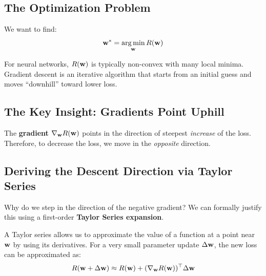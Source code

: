 \subsection{The Optimization Problem}

We want to find:
\[
\mathbf{w}^* = \mathop{\mathrm{arg\,min}}_{\mathbf{w}} R(\mathbf{w})
\]

For neural networks, $R(\mathbf{w})$ is typically non-convex with many local minima. Gradient descent is an iterative algorithm that starts from an initial guess and moves ``downhill'' toward lower loss.

\subsection{The Key Insight: Gradients Point Uphill}

The \textbf{gradient} $\nabla_{\mathbf{w}} R(\mathbf{w})$ points in the direction of steepest \textit{increase} of the loss. Therefore, to decrease the loss, we move in the \textit{opposite} direction.

\begin{center}
\end{center}

\subsection{Deriving the Descent Direction via Taylor Series}

Why do we step in the direction of the negative gradient? We can formally justify this using a first-order \textbf{Taylor Series expansion}. 

A Taylor series allows us to approximate the value of a function at a point near $\mathbf{w}$ by using its derivatives. For a very small parameter update $\Delta \mathbf{w}$, the new loss can be approximated as:
\[
R(\mathbf{w} + \Delta \mathbf{w}) \approx R(\mathbf{w}) + (\nabla_{\mathbf{w}} R(\mathbf{w}))^\top \Delta \mathbf{w}
\]

